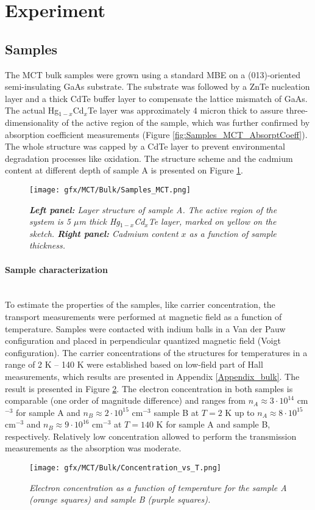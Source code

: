 \documentclass[titlepage,a4paper]{book}
\newcommand{\wciecie}{\quad\phantom{v}}
\newcommand{\myparagraph}[1]{\paragraph{#1}\mbox{}\\}
\begin{document}
\section{Experiment}
\subsection{Samples}
\wciecie
The MCT bulk samples were grown using a standard MBE on a (013)-oriented semi-insulating GaAs substrate. The substrate was followed by a ZnTe nucleation layer and a thick CdTe buffer layer to compensate the lattice mismatch of GaAs. The actual Hg$_{1-x}$Cd$_x$Te layer was approximately 4 micron thick to assure three-dimensionality of the active region of the sample, which was further confirmed by absorption coefficient measurements (Figure \ref{fig:Samples_MCT_AbsorptCoeff}). The whole structure was capped by a CdTe layer to prevent environmental degradation processes like oxidation. The structure scheme and the cadmium content at different depth of sample A is presented on Figure \ref{fig:Samples_MCT}. 

\begin{figure}[ht]
	\centering
	\texttt{[image: gfx/MCT/Bulk/Samples\_MCT.png]}
	\vspace{-10pt}
	\caption{\textit{\textbf{Left panel:} Layer structure of sample A. The active region of the system is 5 $\mu$m thick Hg$_{1-x}$Cd$_x$Te layer, marked on yellow on the sketch. \textbf{Right panel:} Cadmium content $x$ as a function of sample thickness.}}
	\label{fig:Samples_MCT}
\end{figure} 

\myparagraph{Sample characterization}
\wciecie
To estimate the properties of the samples, like carrier concentration, the transport measurements were performed at magnetic field as a function of temperature. Samples were contacted with indium balls in a Van der Pauw configuration and placed in perpendicular quantized magnetic field (Voigt configuration). The carrier concentrations of the structures for temperatures in a range of 2 K -- 140 K were established based on low-field part of Hall measurements, which results are presented in Appendix \ref{Appendix_bulk}. The result is presented in Figure \ref{fig:Samples_MCT_Transport}. The electron concentration in both samples is comparable (one order of magnitude difference) and ranges from $n_A \approx 3 \cdot 10^{14}$ cm$^{-3}$ for sample A and $n_B \approx 2 \cdot 10^{15}$ cm$^{-3}$ sample B at $T = 2$ K up to $n_A \approx 8 \cdot 10^{15}$ cm$^{-3}$ and $n_B \approx 9 \cdot 10^{16}$ cm$^{-3}$ at $T = 140$ K for sample A and sample B, respectively. Relatively low concentration allowed to perform the transmission measurements as the absorption was moderate. 
\begin{figure}[ht]
	\centering
	\texttt{[image: gfx/MCT/Bulk/Concentration\_vs\_T.png]}
	\vspace{-10pt}
	\caption{\textit{Electron concentration as a function of temperature for the sample A (orange squares) and sample B (purple squares).}}
	\label{fig:Samples_MCT_Transport}
\end{figure} 
\end{document}
